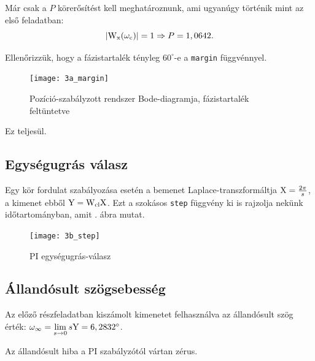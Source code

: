 Már csak a $P$ körerősítést kell meghatároznunk, ami ugyanúgy történik mint az első feladatban:
\begin{equation}
	\left\lvert \mathrm{W}_\text{x}(\omega_\text{c}) \right\rvert = 1 \Rightarrow P = 1,0642.
\end{equation}

Ellenőrizzük, hogy a fázistartalék tényleg $60^\circ$-e a \verb|margin| függvénnyel.
\begin{figure}[H]
	\centering
	\texttt{[image: 3a\_margin]}
	\caption{Pozíció-szabályzott rendszer Bode-diagramja, fázistartalék feltüntetve}
	\label{fig:3a_margin}
\end{figure}

Ez teljesül.


\subsection{Egységugrás válasz}

Egy kör fordulat szabályozása esetén a bemenet Laplace-transzformáltja $\mathrm{X}=\frac{2\pi}{s}$,
a kimenet ebből $\mathrm{Y} = \mathrm{W}_\text{cl}\mathrm{X}$. Ezt a szokásos \verb|step| függvény
ki is rajzolja nekünk időtartományban, amit . ábra mutat.

\begin{figure}[H]
	\centering
	\texttt{[image: 3b\_step]}
	\caption{PI egységugrás-válasz}
	\label{fig:3b_step}
\end{figure}


\subsection{Állandósult szögsebesség}

Az előző részfeladatban kiszámolt kimenetet felhasználva az állandósult szög érték:
$\omega_\infty = \lim\limits_{s\rightarrow 0}s\mathrm{Y} = 6,2832^\circ$.

Az állandósult hiba a PI szabályzótól vártan zérus.

